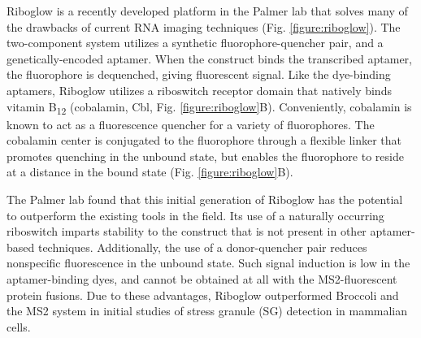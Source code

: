 Riboglow is a recently developed platform in the Palmer lab that solves many of the drawbacks of current RNA imaging techniques (Fig. \ref{figure:riboglow}).\cite{BraselmannDevelopmentriboswitchbasedplatform2017} The two-component system utilizes a synthetic fluorophore-quencher pair, and a genetically-encoded aptamer.
When the construct binds the transcribed aptamer, the fluorophore is dequenched, giving fluorescent signal. Like the dye-binding aptamers, Riboglow utilizes a riboswitch receptor domain that natively binds vitamin B\textsubscript{12} (cobalamin, Cbl, Fig. \ref{figure:riboglow}B).\cite{JohnsonJrB12cofactorsdirectly2012} Conveniently, cobalamin is known to act as a fluorescence quencher for a variety of fluorophores.\cite{RosendahlSynthesisbiologicalactivity1982,LeeDesignSynthesisCharacterization2009,SmeltzerSynthesisCharacterizationFluorescent2001} The cobalamin center is conjugated to the fluorophore through a flexible linker that promotes quenching in the unbound state, but enables the fluorophore to reside at a distance in the bound state (Fig. \ref{figure:riboglow}B).

The Palmer lab found that this initial generation of Riboglow has the potential to outperform the existing tools in the field. Its use of a naturally occurring riboswitch imparts stability to the construct that is not present in other aptamer-based techniques. Additionally, the use of a donor-quencher pair reduces nonspecific fluorescence in the unbound state. Such signal induction is low in the aptamer-binding dyes, and cannot be obtained at all with the MS2-fluorescent protein fusions. Due to these advantages, Riboglow outperformed Broccoli and the MS2 system in initial studies of stress granule (SG) detection in mammalian cells.

